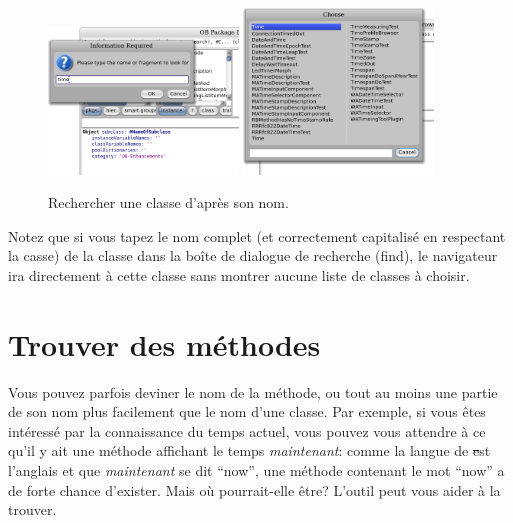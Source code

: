 \documentclass[a4paper,10pt,twoside]{book}
\begin{document}
\begin{figure}[hbt]
\centerline{
	\includegraphics[width=0.45\textwidth]{FindIt}
	\hspace{1cm}
	\includegraphics[width=0.45\textwidth]{TimeClasses}
}
\caption{Rechercher une classe d'après son nom.}
\end{figure}

Notez que si vous tapez le nom complet (et correctement capitalisé 
\cad en respectant la casse)
de la classe dans la boîte de dialogue de recherche (find), le
navigateur ira directement à cette classe sans montrer aucune liste
de classes à choisir.

\section{Trouver des méthodes}

Vous pouvez parfois deviner le nom de la méthode, ou tout au moins
une partie de son nom plus facilement que le nom d'une classe.
Par exemple, si vous êtes intéressé par la connaissance du temps
actuel, vous pouvez vous attendre à ce qu'il y ait 
une méthode affichant le temps \emph{maintenant}: comme la langue de \st
est l'anglais et que \emph{maintenant} se dit ``now'', une méthode
contenant le mot ``now'' a de forte chance d'exister.
Mais où pourrait-elle être?
L'outil  peut vous aider à la trouver.
\end{document}

